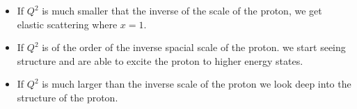 \documentclass[12pt]{article}
\begin{document}
\begin{itemize}
\item If $Q^2$ is much smaller that the inverse of the scale of the proton, we get elastic scattering where $x=1$.
\item If $Q^2$ is of the order of the inverse spacial scale of the proton. we start seeing structure and are able to excite the proton to higher energy states.
\item If $Q^2$ is much larger than the inverse scale of the proton we look deep into the structure of the proton.  
\end{itemize}
\end{document}
